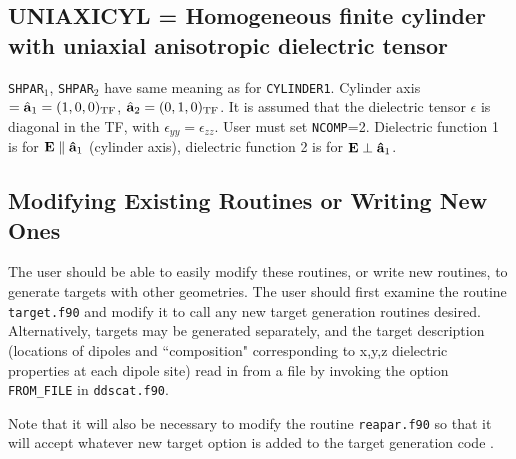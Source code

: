 \subsection{ UNIAXICYL = Homogeneous finite cylinder with uniaxial anisotropic 
	    dielectric tensor
            \label{sec:UNIAXICYL}}
	{\tt SHPAR$_1$}, {\tt SHPAR$_2$} have same meaning as for
	{\tt CYLINDER1}.
	Cylinder axis $={\hat{\bf a}}_1=(1,0,0)_{\rm TF}$, 
	${\hat{\bf a}}_2=(0,1,0)_{\rm TF}$. 
	It is assumed that the dielectric tensor $\epsilon$ 
	is diagonal in the TF,
	with $\epsilon_{yy}=\epsilon_{zz}$.
	User must set
	{\tt NCOMP}=2.
	Dielectric function 1 is for ${\bf E} \parallel {\bf\hat{a}}_1$
	(cylinder axis), dielectric function 2 is for 
	${\bf E} \perp {\bf\hat{a}}_1$.
\bigskip
{}
\subsection{ Modifying Existing Routines or Writing New Ones}

The user should be able to easily modify these routines, or write new
routines, to generate targets with other geometries.  The user should
first examine the routine {\tt target.f90} and modify it to call any new
target generation routines desired.  Alternatively, targets may be
generated separately, and the target description (locations of dipoles
and ``composition" corresponding to x,y,z dielectric properties at
each dipole site) read in from a file by invoking the option {\tt
FROM\_FILE} in {\tt ddscat.f90}.

Note that it will also be necessary to modify the routine {\tt reapar.f90}
so that it will accept whatever new target option is added to the
target generation code
.
\bigskip
